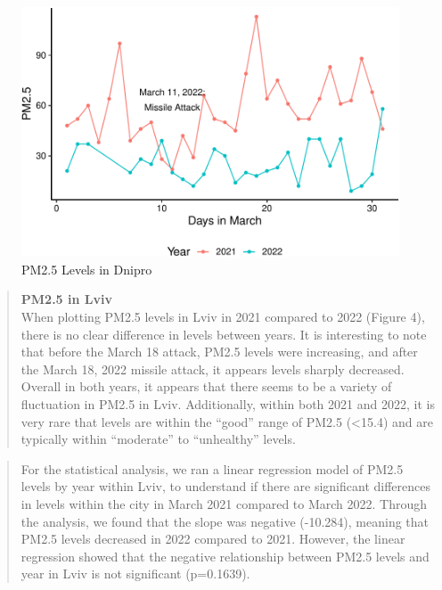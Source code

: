 \documentclass[
  12pt,
]{article}
\begin{document}
\begin{figure}
\centering
\includegraphics{Fontanie_Gordon_Weinberg_Project_files/figure-latex/Visualizing PM25 in Dnipro-1.pdf}
\caption{PM2.5 Levels in Dnipro}
\end{figure}

\newpage

\begin{quote}
\textbf{PM2.5 in Lviv}\\
When plotting PM2.5 levels in Lviv in 2021 compared to 2022 (Figure 4),
there is no clear difference in levels between years. It is interesting
to note that before the March 18 attack, PM2.5 levels were increasing,
and after the March 18, 2022 missile attack, it appears levels sharply
decreased. Overall in both years, it appears that there seems to be a
variety of fluctuation in PM2.5 in Lviv. Additionally, within both 2021
and 2022, it is very rare that levels are within the ``good'' range of
PM2.5 (\textless15.4) and are typically within ``moderate'' to
``unhealthy'' levels.
\end{quote}

\begin{quote}
For the statistical analysis, we ran a linear regression model of PM2.5
levels by year within Lviv, to understand if there are significant
differences in levels within the city in March 2021 compared to March
2022. Through the analysis, we found that the slope was negative
(-10.284), meaning that PM2.5 levels decreased in 2022 compared to 2021.
However, the linear regression showed that the negative relationship
between PM2.5 levels and year in Lviv is not significant (p=0.1639).
\end{quote}
\end{document}
